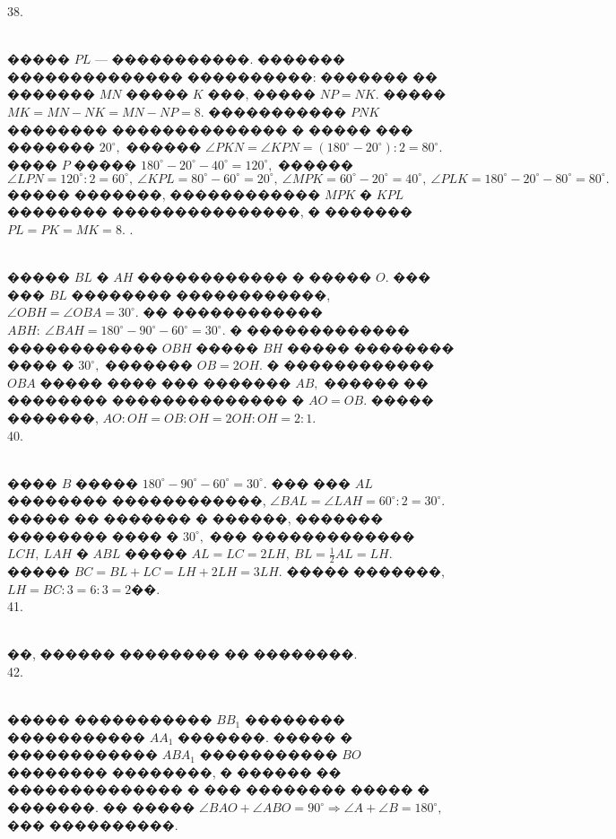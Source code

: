 \documentclass[12pt]{article}
\begin{document}
38. \begin{figure}[ht!]
\end{figure}\\
����� $PL$ --- �����������. ������� �������������� ����������: ������� �� ������� $MN$ ����� $K$ ���, ����� $NP=NK.$ ����� $MK=MN-NK=MN-NP=8.$ ����������� $PNK$ �������� �������������� � ����� ��� ������� $20^\circ,$ ������ $\angle PKN=\angle KPN=(180^\circ-20^\circ):2=80^\circ.$ ���� $P$ ����� $180^\circ-20^\circ-40^\circ=120^\circ,$ ������ $\angle LPN=120^\circ:2=60^\circ,\ \angle KPL=80^\circ-60^\circ=20^\circ,\ \angle MPK=60^\circ-20^\circ=40^\circ,\ \angle PLK=180^\circ-20^\circ-80^\circ=80^\circ.$ ����� �������, ������������ $MPK$ � $KPL$ �������� ���������������, � ������� $PL=PK=MK=8.$\newpage
{}. \begin{figure}[ht!]
\end{figure}\\
����� $BL$ � $AH$ ������������ � ����� $O.$ ��� ��� $BL$ �������� ������������, $\angle OBH=\angle OBA=30^\circ.$ �� ������������ $ABH:\ \angle BAH=180^\circ-90^\circ-60^\circ=30^\circ.$ � ������������� ������������ $OBH$ ����� $BH$ ����� �������� ���� � $30^\circ,$ ������� $OB=2OH.$ � ������������ $OBA$ ����� ���� ��� ������� $AB,$ ������ �� �������� �������������� � $AO=OB.$ ����� �������, $AO:OH=OB:OH=2OH:OH=2:1.$\\
40. \begin{figure}[ht!]
\end{figure}\\
���� $B$ ����� $180^\circ-90^\circ-60^\circ=30^\circ.$ ��� ��� $AL$ �������� ������������, $\angle BAL= \angle LAH=60^\circ:2=30^\circ.$ ����� �� ������� � ������, ������� �������� ���� � $30^\circ,$ ��� ������������� $LCH,\ LAH$ � $ABL$ ����� $AL=LC=2LH,\ BL=\frac{1}{2}AL=LH.$ ����� $BC=BL+LC=LH+2LH=3LH.$ ����� �������, $LH=BC:3=6:3=2$��.\\
41. \begin{figure}[ht!]
\end{figure}\\
��, ������ �������� �� ��������.\\
42. \begin{figure}[ht!]
\end{figure}\\
����� ����������� $BB_1$ �������� ����������� $AA_1$ �������. ����� � ������������ $ABA_1$ ����������� $BO$ �������� ��������, � ������ �� �������������� � ��� �������� ����� � �������. �� ����� $\angle BAO+\angle ABO=90^\circ\Rightarrow \angle A+\angle B=180^\circ,$ ��� ����������.\\
\end{document}
